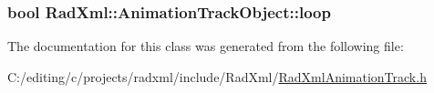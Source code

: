\hypertarget{class_rad_xml_1_1_animation_track_object_a440a788ddd3052c79acc55834cdceace}{
\subsubsection[{loop}]{\setlength{\rightskip}{0pt plus 5cm}bool Rad\-Xml\-::\-Animation\-Track\-Object\-::loop}}\label{class_rad_xml_1_1_animation_track_object_a440a788ddd3052c79acc55834cdceace}


The documentation for this class was generated from the following file\-:\begin{DoxyCompactItemize}
\item 
C\-:/editing/c/projects/radxml/include/\-Rad\-Xml/\hyperlink{_rad_xml_animation_track_8h}{Rad\-Xml\-Animation\-Track.\-h}\end{DoxyCompactItemize}
